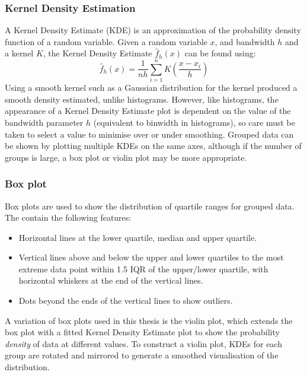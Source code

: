 \subsubsection{Kernel Density Estimation}

A Kernel Density Estimate (KDE) is an approximation of the probability
density function of a random variable. Given a random variable $x$,
and bandwidth $h$ and a kernel $K$, the Kernel Density Estimate
$\hat{f}_h(x)$ can be found using:
%
\begin{equation}
  \hat{f}_h(x) = \frac{1}{nh} \sum^{n}_{i=1} K\left( \frac{x - x_i}{h} \right)
\end{equation}
%
Using a smooth kernel such as a Gaussian distribution for the kernel
produced a smooth density estimated, unlike histograms. However, like
histograms, the appearance of a Kernel Density Estimate plot is
dependent on the value of the bandwidth parameter $h$ (equivalent to
binwidth in histograms), so care must be taken to select a value to
minimise over or under smoothing. Grouped data can be shown by
plotting multiple KDEs on the same axes, although if the number of
groups is large, a box plot or violin plot may be more appropriate.


\subsubsection{Box plot}

Box plots are used to show the distribution of quartile ranges for
grouped data. The contain the following features:

\begin{itemize}
\item Horizontal lines at the lower quartile, median and upper
  quartile.
\item Vertical lines above and below the upper and lower quartiles to
  the most extreme data point within 1.5 IQR of the upper/lower
  quartile, with horizontal whiskers at the end of the vertical lines.
\item Dots beyond the ends of the vertical lines to show outliers.
\end{itemize}

A variation of box plots used in this thesis is the violin plot, which
extends the box plot with a fitted Kernel Density Estimate plot to
show the probability \emph{density} of data at different values. To
construct a violin plot, KDEs for each group are rotated and mirrored
to generate a smoothed visualisation of the distribution.


